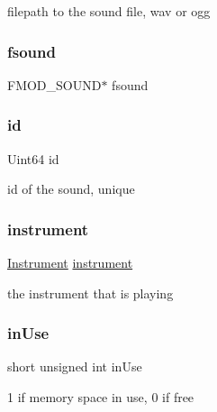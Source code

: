 filepath to the sound file, wav or ogg 

\mbox{\label{structsound__s_ac1072fb2f49995e1342ffcfef83774c4}} 
\subsubsection{\texorpdfstring{fsound}{fsound}}
{\footnotesize\ttfamily F\+M\+O\+D\+\_\+\+S\+O\+U\+ND$\ast$ fsound}

\mbox{\label{structsound__s_a4158e9a3af9337e59f9b8de984c0efba}} 
\subsubsection{\texorpdfstring{id}{id}}
{\footnotesize\ttfamily Uint64 id}



id of the sound, unique 

\mbox{\label{structsound__s_a88fb6e4086e01e476912df234d0f9d20}} 
\subsubsection{\texorpdfstring{instrument}{instrument}}
{\footnotesize\ttfamily \hyperlink{entity__s_8h_a498adc21b55fb917031c541073699945}{Instrument} \hyperlink{entity__s_8h_a5ecc67d6ad08ff53b53b485ee75d4017}{instrument}}



the instrument that is playing 

\mbox{\label{structsound__s_a13159f6b47122dc47eb11b1653a1663a}} 
\subsubsection{\texorpdfstring{in\+Use}{inUse}}
{\footnotesize\ttfamily short unsigned int in\+Use}



1 if memory space in use, 0 if free 

